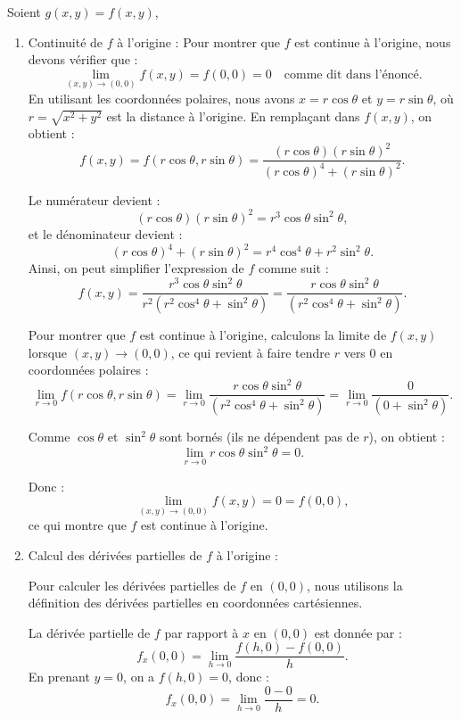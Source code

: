 \begin{solution}
Soient $g(x,y) = f(x,y)$,
\begin{enumerate}
    \item Continuité de \( f \) à l'origine : 
    Pour montrer que \( f \) est continue à l'origine, nous devons vérifier que : 
    \[
    \lim_{(x, y) \to (0, 0)} f(x, y) = f(0, 0) = 0 \quad \text{comme dit dans l'énoncé}.
    \]
    En utilisant les coordonnées polaires, nous avons \( x = r \cos \theta \) et \( y = r \sin \theta \), où \( r = \sqrt{x^2 + y^2} \) est la distance à l'origine. En remplaçant dans \( f(x, y) \), on obtient :
    \[
    f(x, y) = f(r \cos \theta, r \sin \theta) = \frac{(r \cos \theta)(r \sin \theta)^2}{(r \cos \theta)^4 + (r \sin \theta)^2}.
    \]
    
    Le numérateur devient :
    \[
    (r \cos \theta)(r \sin \theta)^2 = r^3 \cos \theta \sin^2 \theta,
    \]
    et le dénominateur devient :
    \[
    (r \cos \theta)^4 + (r \sin \theta)^2 = r^4 \cos^4 \theta + r^2 \sin^2 \theta.
    \]
    Ainsi, on peut simplifier l'expression de \( f \) comme suit :
    \[
    f(x, y) = \frac{r^3 \cos \theta \sin^2 \theta}{r^2 (r^2 \cos^4 \theta + \sin^2 \theta)} = \frac{r \cos \theta \sin^2 \theta}{ (r^2 \cos^4 \theta + \sin^2 \theta)}.
    \]
    
    Pour montrer que \( f \) est continue à l'origine, calculons la limite de \( f(x, y) \) lorsque \( (x, y) \to (0, 0) \), ce qui revient à faire tendre \( r \) vers 0 en coordonnées polaires :
    \[
    \lim_{r \to 0} f(r \cos \theta, r \sin \theta) = \lim_{r \to 0} \frac{r \cos \theta \sin^2 \theta}{ (r^2 \cos^4 \theta + \sin^2 \theta)} = \lim_{r \to 0} \frac{0}{ (0 + \sin^2 \theta)}.
    \]
    
    Comme \( \cos \theta \) et \( \sin^2 \theta \) sont bornés (ils ne dépendent pas de \( r \)), on obtient :
    \[
    \lim_{r \to 0} r \cos \theta \sin^2 \theta = 0.
    \]
    
    Donc :
    \[
    \lim_{(x, y) \to (0, 0)} f(x, y) = 0 = f(0, 0),
    \]
    ce qui montre que \( f \) est continue à l'origine.

    \item Calcul des dérivées partielles de \( f \) à l'origine :

    Pour calculer les dérivées partielles de \( f \) en \( (0, 0) \), nous utilisons la définition des dérivées partielles en coordonnées cartésiennes.

    La dérivée partielle de \( f \) par rapport à \( x \) en \( (0, 0) \) est donnée par :
    \[
    f_x(0, 0) = \lim_{h \to 0} \frac{f(h, 0) - f(0, 0)}{h}.
    \]
    En prenant \( y = 0 \), on a \( f(h, 0) = 0 \), donc :
    \[
    f_x(0, 0) = \lim_{h \to 0} \frac{0 - 0}{h} = 0.
    \]


\end{enumerate}
\end{solution}
